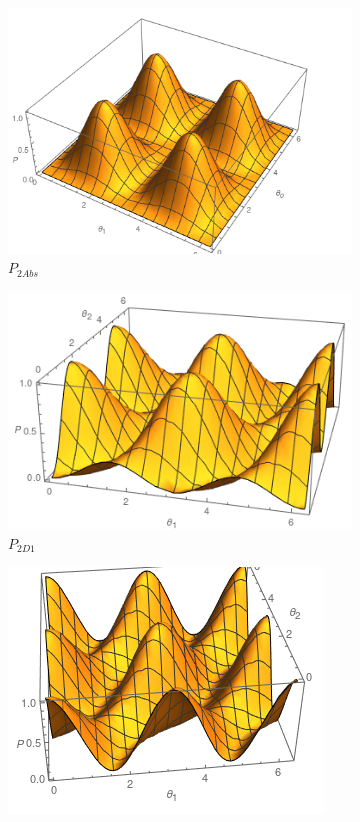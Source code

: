 \documentclass[11pt]{article}
\begin{document}
\begin{figure}[h!]
\centering
\begin{subfigure}[b]{0.45\linewidth}
\includegraphics[width=\linewidth]{P1abs.png}
\caption{$P_{2Abs}$}
\label{fig:BS2}
\end{subfigure}
\begin{subfigure}[b]{0.45\linewidth}
\includegraphics[width=\linewidth]{P1d1.png}
\caption{$P_{2D1}$}
\label{fig:westminster_aerea}
\end{subfigure}
\begin{subfigure}[b]{0.45\linewidth}
\includegraphics[width=\linewidth]{P1d2.png}

\end{subfigure}
\end{figure}
\end{document}
